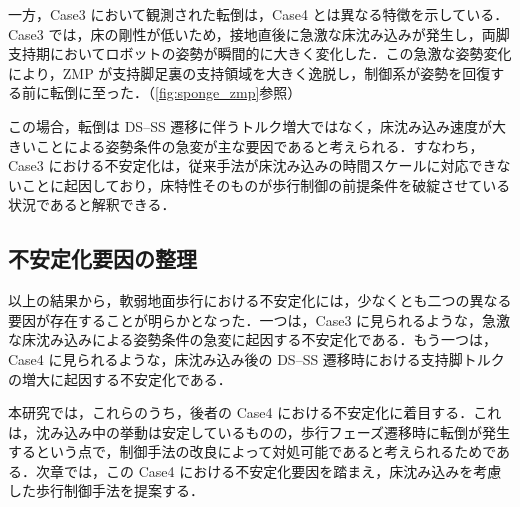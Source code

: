 一方，Case3 において観測された転倒は，Case4 とは異なる特徴を示している．Case3 では，床の剛性が低いため，接地直後に急激な床沈み込みが発生し，両脚支持期においてロボットの姿勢が瞬間的に大きく変化した．この急激な姿勢変化により，ZMP が支持脚足裏の支持領域を大きく逸脱し，制御系が姿勢を回復する前に転倒に至った．（\cref{fig:sponge_zmp}参照）

この場合，転倒は DS--SS 遷移に伴うトルク増大ではなく，床沈み込み速度が大きいことによる姿勢条件の急変が主な要因であると考えられる．すなわち，Case3 における不安定化は，従来手法が床沈み込みの時間スケールに対応できないことに起因しており，床特性そのものが歩行制御の前提条件を破綻させている状況であると解釈できる．

\subsection{不安定化要因の整理}
\label{subsec:instability_summary}

以上の結果から，軟弱地面歩行における不安定化には，少なくとも二つの異なる要因が存在することが明らかとなった．一つは，Case3 に見られるような，急激な床沈み込みによる姿勢条件の急変に起因する不安定化である．もう一つは，Case4 に見られるような，床沈み込み後の DS--SS 遷移時における支持脚トルクの増大に起因する不安定化である．

本研究では，これらのうち，後者の Case4 における不安定化に着目する．これは，沈み込み中の挙動は安定しているものの，歩行フェーズ遷移時に転倒が発生するという点で，制御手法の改良によって対処可能であると考えられるためである．次章では，この Case4 における不安定化要因を踏まえ，床沈み込みを考慮した歩行制御手法を提案する．
